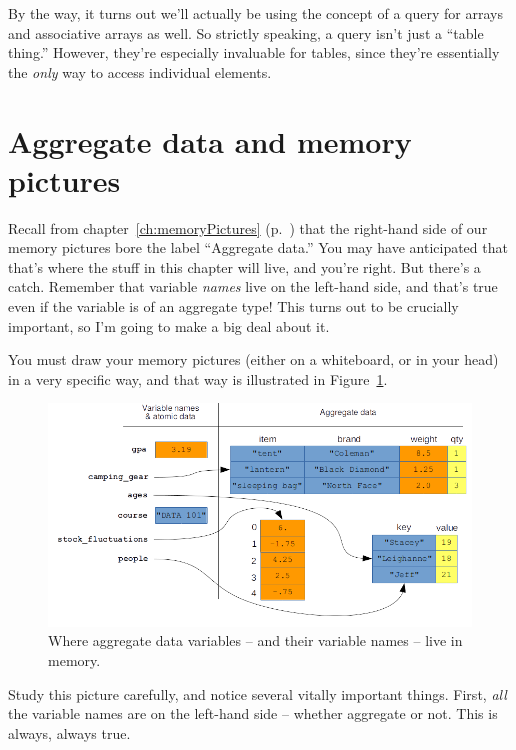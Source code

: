 By the way, it turns out we'll actually be using the concept of a query for
arrays and associative arrays as well. So strictly speaking, a query isn't just
a ``table thing.'' However, they're especially invaluable for tables, since
they're essentially the \textit{only} way to access individual elements.

\section{Aggregate data and memory pictures}

Recall from chapter~\ref{ch:memoryPictures} (p.~\pageref{fig:memoryPicture})
that the right-hand side of our memory pictures bore the label
``\textsf{Aggregate data}.'' You may have anticipated that that's where the
stuff in this chapter will live, and you're right. But there's a catch.
Remember that variable \textit{names} live on the left-hand side, and that's
true even if the variable is of an aggregate type! This turns out to be
crucially important, so I'm going to make a big deal about it.

You must draw your memory pictures (either on a whiteboard, or in your head) in
a very specific way, and that way is illustrated in
Figure~\ref{fig:aggregateMemory}.

\begin{figure}[ht]
\centering
\includegraphics[width=1\textwidth]{aggregateMemory.png}
\caption{Where aggregate data variables -- and their variable names -- live in
memory.}
\label{fig:aggregateMemory}
\end{figure}

Study this picture carefully, and notice several vitally important things.
First, \textit{all} the variable names are on the left-hand side -- whether
aggregate or not. This is always, always true.

